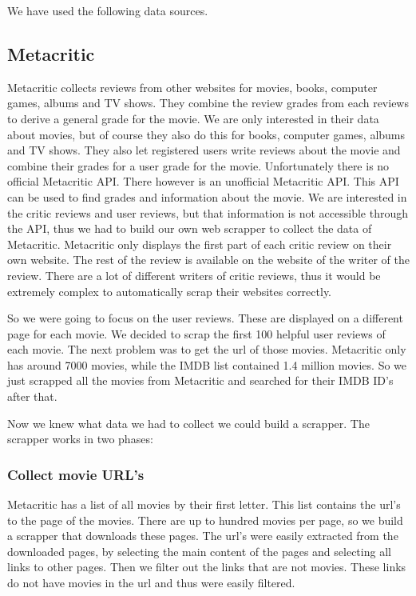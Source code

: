 We have used the following data sources.

\subsection{Metacritic}
\label{sec:data:metacritic}
Metacritic collects reviews from other websites for movies, books, computer games, albums and TV shows. 
They combine the review grades from each reviews to derive a general grade for the movie.
We are only interested in their data about movies, but of course they also do this for books, computer games, albums and TV shows.
They also let registered users write reviews about the movie and combine their grades for a user grade for the movie. 
Unfortunately there is no official Metacritic API. There however is an unofficial Metacritic API. 
This API can be used to find grades and information about the movie.
We are interested in the critic reviews and user reviews, but that information is not accessible through the API, thus we had to build our own web scrapper to collect the data of Metacritic. 
Metacritic only displays the first part of each critic review on their own website. 
The rest of the review is available on the website of the writer of the review. 
There are a lot of different writers of critic reviews, thus it would be extremely complex to automatically scrap their websites correctly. 

So we were going to focus on the user reviews. These are displayed on a different page for each movie. 
We decided to scrap the first 100 helpful user reviews of each movie. 
The next problem was to get the url of those movies. 
Metacritic only has around 7000 movies, while the IMDB list contained 1.4 million movies. 
So we just scrapped all the movies from Metacritic and searched for their IMDB ID’s after that. 

Now we knew what data we had to collect we could build a scrapper.
The scrapper works in two phases:
\subsubsection{Collect movie URL’s }
Metacritic has a list of all movies by their first letter. This list contains the url’s to the page of the movies. 
There are up to hundred movies per page, so we build a scrapper that downloads these pages. 
The url’s were easily extracted from the downloaded pages, by selecting the main content of the pages and selecting all links to other pages. 
Then we filter out the links that are not movies. These links do not have movies in the url and thus were easily filtered. 
